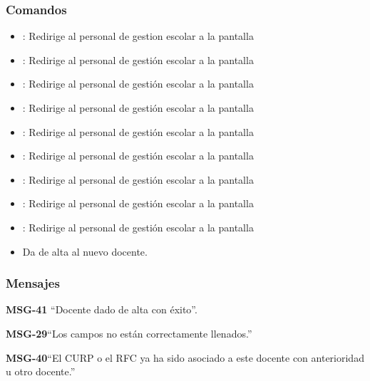 \subsubsection{Comandos}
\begin{itemize}
	\item {}: Redirige al personal de gestion escolar a la pantalla 
	
	\item {}: Redirige al personal de gestión escolar a la pantalla 
	\item {}: Redirige al personal de gestión escolar a la pantalla 
	
	\item {}: Redirige al personal de gestión escolar a la pantalla 
	\item {}: Redirige al personal de gestión escolar a la pantalla 
	
	\item {}: Redirige al personal de gestión escolar a la pantalla 
	\item {}: Redirige al personal de gestión escolar a la pantalla 
	
	\item {}: Redirige al personal de gestión escolar a la pantalla 
	\item {}: Redirige al personal de gestión escolar a la pantalla 
	
    \item {} Da de alta al nuevo docente.
\end{itemize}

\subsubsection{Mensajes}

\begin{Citemize}
    \item {\bf MSG-41} ``Docente dado de alta con éxito''.
    \item {\bf MSG-29}{``Los campos no están correctamente llenados.''}
    \item {\bf MSG-40}{``El CURP o el RFC ya ha sido asociado a este docente con anterioridad u otro docente.''}
\end{Citemize}

